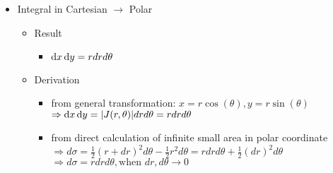 \begin{itemize}
\begin{itemize}
\begin{itemize}
		\end{itemize}
	\end{itemize}
\item Integral in Cartesian $\rightarrow$ Polar
	\begin{itemize}
	\item Result
		\begin{itemize}
		\item $\mathop{}\!\mathrm{d} x\mathop{}\!\mathrm{d} y = rdrd\theta$
		\end{itemize}
	\item Derivation
		\begin{itemize}
		\item from general transformation: $x = r\cos(\theta), y = r\sin(\theta)$ \\
		$\Rightarrow \mathop{}\!\mathrm{d} x\mathop{}\!\mathrm{d} y = \lvert J(r,\theta)\rvert drd\theta = rdrd\theta$
		\item from direct calculation of infinite small area in polar coordinate \\
		$\Rightarrow d\sigma = \frac 12 (r+dr)^2d\theta - \frac 12 r^2d\theta = rdrd\theta +\frac 12 (dr)^2d\theta$ \\			
		$\Rightarrow d\sigma = rdrd\theta, \text{when } dr,d\theta \rightarrow 0$
		\end{itemize}
	\end{itemize}
\end{itemize}

